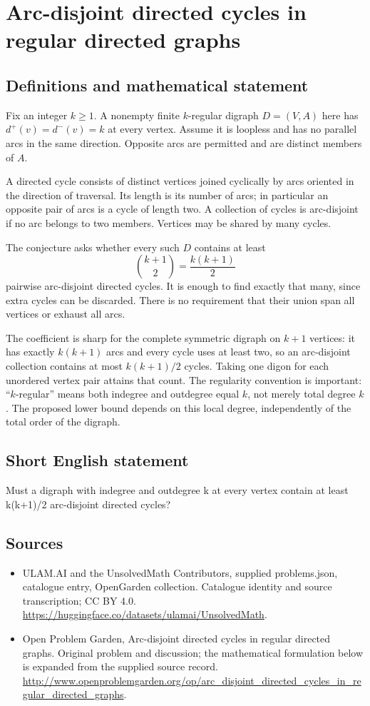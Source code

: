 \documentclass[11pt,a4paper]{article}
\begin{document}
\section*{Arc-disjoint directed cycles in regular directed graphs}\label{statement}

\subsection{Definitions and mathematical statement}
Fix an integer $k\ge1$. A nonempty finite $k$-regular digraph $D=(V,A)$ here has
$d^+(v)=d^-(v)=k$ at every vertex. Assume it is loopless and has no
parallel arcs in the same direction. Opposite arcs are permitted and
are distinct members of $A$.

A directed cycle consists of distinct vertices joined cyclically by
arcs oriented in the direction of traversal. Its length is its number
of arcs; in particular an opposite pair of arcs is a cycle of length
two. A collection of cycles is arc-disjoint if no arc belongs to two
members. Vertices may be shared by many cycles.

The conjecture asks whether every such $D$ contains at least
\[
                             \binom{k+1}{2}=\frac{k(k+1)}2
\]
pairwise arc-disjoint directed cycles. It is enough to find exactly
that many, since extra cycles can be discarded. There is no requirement
that their union span all vertices or exhaust all arcs.

The coefficient is sharp for the complete symmetric digraph on $k+1$
vertices: it has exactly $k(k+1)$ arcs and every cycle uses at least two,
so an arc-disjoint collection contains at most $k(k+1)/2$ cycles. Taking
one digon for each unordered vertex pair attains that count. The
regularity convention is important: ``$k$-regular'' means both indegree
and outdegree equal $k$, not merely total degree $k$. The proposed lower
bound depends on this local degree, independently of the total order
of the digraph.
\subsection{Short English statement}
Must a digraph with indegree and outdegree k at every vertex contain at least k(k+1)/2 arc-disjoint directed cycles?
\subsection{Sources}
\begin{itemize}
\item[S1] ULAM.AI and the UnsolvedMath Contributors, supplied problems.json, catalogue entry, OpenGarden collection. Catalogue identity and source transcription; CC BY 4.0.
\url{https://huggingface.co/datasets/ulamai/UnsolvedMath}.
\item[S2] Open Problem Garden, Arc-disjoint directed cycles in regular directed graphs. Original problem and discussion; the mathematical formulation below is expanded from the supplied source record.
\url{http://www.openproblemgarden.org/op/arc_disjoint_directed_cycles_in_regular_directed_graphs}.
\end{itemize}
\end{document}

